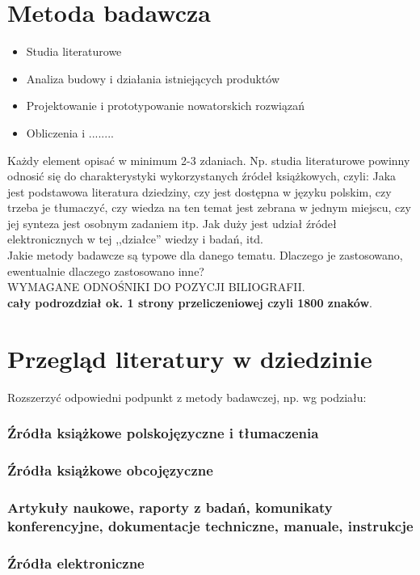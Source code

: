 \documentclass[12pt]{report}
\begin{document}
\section{Metoda badawcza}
\begin{itemize}
\item Studia literaturowe
\item Analiza budowy i działania istniejących produktów
\item Projektowanie i prototypowanie nowatorskich rozwiązań 
\item Obliczenia i ........
\end{itemize}

Każdy element opisać w minimum 2-3 zdaniach. Np. studia literaturowe powinny
odnosić się do charakterystyki wykorzystanych źródeł książkowych, czyli: Jaka
jest podstawowa literatura dziedziny, czy jest dostępna w języku polskim, czy trzeba je tłumaczyć, czy wiedza na ten
temat jest zebrana w jednym miejscu, czy jej synteza jest osobnym zadaniem itp. 
Jak duży jest udział źródeł elektronicznych w tej ,,działce'' wiedzy i badań,
itd. \\
\indent Jakie metody badawcze są typowe dla danego tematu. Dlaczego je
zastosowano, ewentualnie dlaczego zastosowano inne? \\
WYMAGANE ODNOŚNIKI DO POZYCJI BILIOGRAFII.\\
{\bf cały podrozdział ok. 1 strony przeliczeniowej czyli 1800 znaków}.

\section{Przegląd literatury w dziedzinie}
Rozszerzyć odpowiedni podpunkt z metody badawczej, np. wg podziału:
\subsubsection{Źródła książkowe polskojęzyczne i tłumaczenia}
\subsubsection{Źródła książkowe obcojęzyczne}
\subsubsection{Artykuły naukowe, raporty z badań, komunikaty konferencyjne,
dokumentacje techniczne, manuale, instrukcje}
\subsubsection{Źródła elektroniczne}
\end{document}
